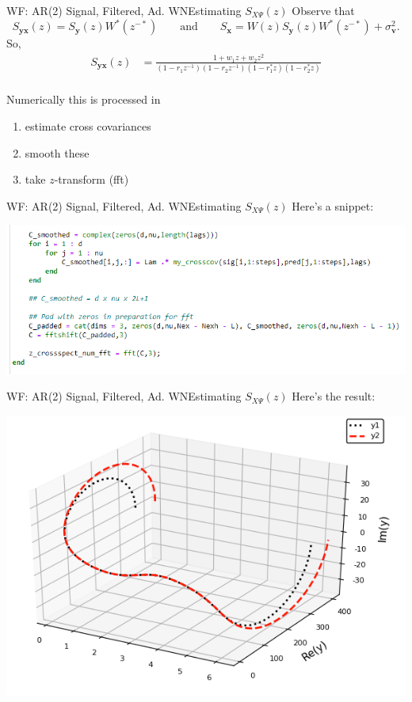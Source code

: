 \documentclass{beamer}  %
\renewcommand{\and}{\qquad \text{and}\qquad}
\begin{document}
\begin{frame}{WF: AR(2) Signal, Filtered, Ad. WN}{Estimating $S_{X\Psi}(z)$}
	Observe that 
	$$S_{\textbf{yx}}(z) = S_{\textbf{y}}(z)W^*(z^{-*}) \and S_{\textbf{x}} = W(z)S_{\textbf{y}}(z)W^*(z^{-*}) + \sigma_{\textbf{v}}^2.$$
	So, 
	\begin{align*}
	S_{\textbf{yx}}(z) &= \frac{1 + w_1 z + w_2 z^{2}}{ (1 - r_1z^{-1})(1 - r_2z^{-1})(1 - r_1^*z)(1 - r_2^*z)}\\
	\end{align*}
	
	Numerically this is processed in 
	\begin{enumerate}
		\item estimate cross covariances
		\item smooth these
		\item take $z$-transform (fft)
	\end{enumerate}
	
\end{frame}
	
	
\begin{frame}{WF: AR(2) Signal, Filtered, Ad. WN}{Estimating $S_{X\Psi}(z)$}
Here's a snippet:


\includegraphics[scale=.6]{fig/Spectsigpred_code.PNG}
	
\end{frame}
	

\begin{frame}{WF: AR(2) Signal, Filtered, Ad. WN}{Estimating $S_{X\Psi}(z)$}
	Here's the result:
	
	
	\includegraphics[scale=.6]{fig/spectsigpred.PNG}
	
\end{frame}
\end{document}
